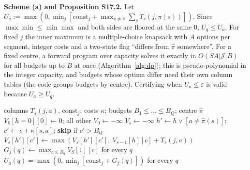 \documentclass[sigconf,anonymous,review]{acmart}
\newcommand{\eps}{\varepsilon}
\begin{document}
\textbf{Scheme (a) and Proposition S17.2.} Let $U_a := \max(0, \min_{j} [\mathrm{const}_j + \max_{\pi \ne \hat\pi} \sum_s T_s(j,\pi(s))])$. Since $\max\min \le \min\max$ and both sides are floored at the same 0, $U_q \le U_a$. For fixed $j$ the inner maximum is a multiple-choice knapsack with $A$ options per segment, integer costs and a two-state flag ``differs from $\hat\pi$ somewhere''. For a fixed centre, a forward program over capacity solves it exactly in $O(SA|\mathcal{J}|B)$ for all budgets up to $B$ at once (Algorithm~\ref{alg:dp}); this is pseudo-polynomial in the integer capacity, and budgets whose optima differ need their own column tables (the code groups budgets by centre). Certifying when $U_a \le \eps$ is valid because $U_a \ge U_q$.

\begin{algorithm}[H]
\caption{Scheme (a): knapsack bound $U_a$ for all budgets.}
\label{alg:dp}
\small
\begin{algorithmic}[1]
\Require columns $T_s(j,a)$, $\mathrm{const}_j$; costs $\kappa$; budgets $B_1 \le \dots \le B_Q$; centre $\hat\pi$
  \State $V_0[h{=}0][0] \gets 0$; all other $V_0 \gets -\infty$ 
    \State $V_s \gets -\infty$
      \State $h' \gets h \vee [a \ne \hat\pi(s)]$; $c' \gets c + \kappa[s,a]$; \textbf{skip} if $c' > B_Q$
      \State $V_s[h'][c'] \gets \max(V_s[h'][c'],\ V_{s-1}[h][c] + T_s(j,a))$ 
    \EndFor
  \EndFor
  \State $G_j(q) \gets \max_{c \le B_q} V_S[1][c]$ for every $q$
\EndFor
\State \Return $U_a(q) = \max(0, \min_j [\mathrm{const}_j + G_j(q)])$ for every $q$
\end{algorithmic}
\end{algorithm}
\end{document}
